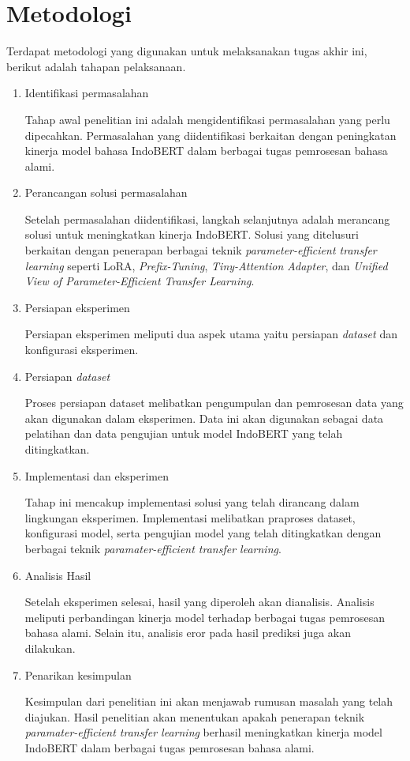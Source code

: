 \section{Metodologi}

Terdapat metodologi yang digunakan untuk melaksanakan tugas akhir ini, berikut adalah tahapan pelaksanaan.

\begin{enumerate}
    \item Identifikasi permasalahan
    
    Tahap awal penelitian ini adalah mengidentifikasi permasalahan yang perlu dipecahkan. Permasalahan yang diidentifikasi berkaitan dengan peningkatan kinerja model bahasa IndoBERT dalam berbagai tugas pemrosesan bahasa alami.

    \item Perancangan solusi permasalahan
    
    Setelah permasalahan diidentifikasi, langkah selanjutnya adalah merancang solusi untuk meningkatkan kinerja IndoBERT. Solusi yang ditelusuri berkaitan dengan penerapan berbagai teknik \textit{parameter-efficient transfer learning} seperti LoRA, \textit{Prefix-Tuning}, \textit{Tiny-Attention Adapter}, dan \textit{Unified View of Parameter-Efficient Transfer Learning}.

    \item Persiapan eksperimen
    
    Persiapan eksperimen meliputi dua aspek utama yaitu persiapan \textit{dataset} dan konfigurasi eksperimen.

    \item Persiapan \textit{dataset}
    
    Proses persiapan dataset melibatkan pengumpulan dan pemrosesan data yang akan digunakan dalam eksperimen. Data ini akan digunakan sebagai data pelatihan dan data pengujian untuk model IndoBERT yang telah ditingkatkan.

    \item Implementasi dan eksperimen
    
    Tahap ini mencakup implementasi solusi yang telah dirancang dalam lingkungan eksperimen. Implementasi melibatkan praproses dataset, konfigurasi model, serta pengujian model yang telah ditingkatkan dengan berbagai teknik \textit{paramater-efficient transfer learning}.

    \item Analisis Hasil
    
    Setelah eksperimen selesai, hasil yang diperoleh akan dianalisis. Analisis meliputi perbandingan kinerja model terhadap berbagai tugas pemrosesan bahasa alami. Selain itu, analisis eror pada hasil prediksi juga akan dilakukan.

    \item Penarikan kesimpulan
    
    Kesimpulan dari penelitian ini akan menjawab rumusan masalah yang telah diajukan. Hasil penelitian akan menentukan apakah penerapan teknik \textit{paramater-efficient transfer learning} berhasil meningkatkan kinerja model IndoBERT dalam berbagai tugas pemrosesan bahasa alami.

\end{enumerate}